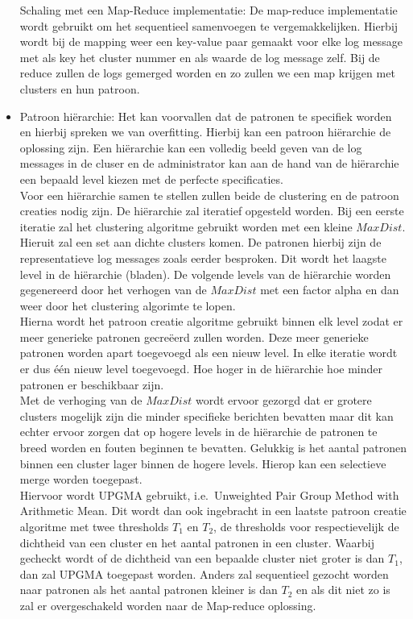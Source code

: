 \begin{itemize}
    \subitem Schaling met een Map-Reduce implementatie: De map-reduce implementatie wordt gebruikt om het sequentieel samenvoegen te vergemakkelijken. Hierbij wordt bij de mapping weer een key-value paar gemaakt voor elke log message met als key het cluster nummer en als waarde de log message zelf. Bij de reduce zullen de logs gemerged worden en zo zullen we een map krijgen met clusters en hun patroon. \\
    
    \item Patroon hiërarchie: Het kan voorvallen dat de patronen te specifiek worden en hierbij spreken we van overfitting. Hierbij kan een patroon hiërarchie de oplossing zijn. Een hiërarchie kan een volledig beeld geven van de log messages in de cluser en de administrator kan aan de hand van de hiërarchie een bepaald level kiezen met de perfecte specificaties.\\
    
    Voor een hiërarchie samen te stellen zullen beide de clustering en de patroon creaties nodig zijn. De hiërarchie zal iteratief opgesteld worden. Bij een eerste iteratie zal het clustering algoritme gebruikt worden met een kleine $MaxDist$. Hieruit zal een set aan dichte clusters komen. De patronen hierbij zijn de representatieve log messages zoals eerder besproken. Dit wordt het laagste level in de hiërarchie (bladen). De volgende levels van de hiërarchie worden gegenereerd door het verhogen van de $MaxDist$ met een factor alpha en dan weer door het clustering algorimte te lopen.\\
    
    Hierna wordt het patroon creatie algoritme gebruikt binnen elk level zodat er meer generieke patronen gecreëerd zullen worden. Deze meer generieke patronen worden apart toegevoegd als een nieuw level. In elke iteratie wordt er dus één nieuw level toegevoegd. Hoe hoger in de hiërarchie hoe minder patronen er beschikbaar zijn.\\
    
    Met de verhoging van de $MaxDist$ wordt ervoor gezorgd dat er grotere clusters mogelijk zijn die minder specifieke berichten bevatten maar dit kan echter ervoor zorgen dat op hogere levels in de hiërarchie de patronen te breed worden en fouten beginnen te bevatten. Gelukkig is het aantal patronen binnen een cluster lager binnen de hogere levels. Hierop kan een selectieve merge worden toegepast.\\
    
    Hiervoor wordt UPGMA gebruikt, i.e.\ Unweighted Pair Group Method with Arithmetic Mean. Dit wordt dan ook ingebracht in een laatste patroon creatie algoritme met twee thresholds \(T_{1}\) en \(T_{2}\), de thresholds voor respectievelijk de dichtheid van een cluster en het aantal patronen in een cluster. Waarbij gecheckt wordt of de dichtheid van een bepaalde cluster niet groter is dan \(T_{1}\), dan zal UPGMA toegepast worden. Anders zal sequentieel gezocht worden naar patronen als het aantal patronen kleiner is dan \(T_{2}\) en als dit niet zo is zal er overgeschakeld worden naar de Map-reduce oplossing.\\
    

\end{itemize}
